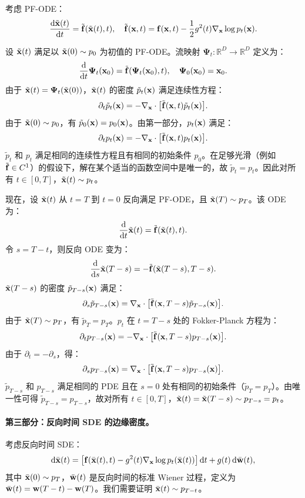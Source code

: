 考虑 PF-ODE：
\[
\frac{\mathop{}\!\mathrm{d} \tilde{{\mathbf{x}}}(t)}{\mathop{}\!\mathrm{d} t} = \tilde {{\mathbf{f}}}(\tilde{{\mathbf{x}}}(t), t), \quad \tilde {{\mathbf{f}}}({\mathbf{x}}, t) = {\mathbf{f}}({\mathbf{x}}, t) - \frac{1}{2} g^2(t) \nabla_{{\mathbf{x}}} \log p_t({\mathbf{x}}).
\]

 设 $\tilde{{\mathbf{x}}}(t)$ 满足以 $\tilde{{\mathbf{x}}}(0) \sim p_0$ 为初值的 PF-ODE。流映射 $\bm{\Psi}_t: \mathbb{R}^D \to \mathbb{R}^D$ 定义为：
\[
\frac{\mathop{}\!\mathrm{d}}{\mathop{}\!\mathrm{d} t} \bm{\Psi}_t(\mathbf{x}_0) = \tilde {{\mathbf{f}}}(\bm{\Psi}_t(\mathbf{x}_0), t), \quad \bm{\Psi}_0(\mathbf{x}_0) = \mathbf{x}_0.
\]
由于 $\tilde{{\mathbf{x}}}(t) = \bm{\Psi}_t(\tilde{{\mathbf{x}}}(0))$，$\tilde{{\mathbf{x}}}(t)$ 的密度 $\tilde p_t({\mathbf{x}})$ 满足连续性方程：
\[
\partial_t \tilde p_t({\mathbf{x}}) = -\nabla_{{\mathbf{x}}} \cdot \bigl[ \tilde {{\mathbf{f}}}({\mathbf{x}}, t) \tilde p_t({\mathbf{x}}) \bigr].
\]
由于 $\tilde{{\mathbf{x}}}(0) \sim p_0$，有 $\tilde p_0({\mathbf{x}}) = p_0({\mathbf{x}})$。由第一部分，$p_t({\mathbf{x}})$ 满足：
\[
\partial_t p_t({\mathbf{x}}) = -\nabla_{{\mathbf{x}}} \cdot \bigl[ \tilde {{\mathbf{f}}}({\mathbf{x}}, t) p_t({\mathbf{x}}) \bigr].
\]
$\tilde p_t$ 和 $p_t$ 满足相同的连续性方程且有相同的初始条件 $p_0$。在足够光滑（例如 $\tilde {{\mathbf{f}}} \in C^1$）的假设下，解在某个适当的函数空间中是唯一的，故 $\tilde p_t = p_t$。因此对所有 $t \in [0, T]$，$\tilde{{\mathbf{x}}}(t) \sim p_t$。

\vspace{0.3cm}
 现在，设 $\tilde{{\mathbf{x}}}(t)$ 从 $t = T$ 到 $t = 0$ 反向满足 PF-ODE，且 $\tilde{{\mathbf{x}}}(T) \sim p_T$。该 ODE 为：
\[
\frac{\mathop{}\!\mathrm{d}}{\mathop{}\!\mathrm{d} t} \tilde{{\mathbf{x}}}(t) = \tilde {{\mathbf{f}}}(\tilde{{\mathbf{x}}}(t), t).
\]
令 $s = T - t$，则反向 ODE 变为：
\[
\frac{\mathop{}\!\mathrm{d}}{\mathop{}\!\mathrm{d} s} \tilde{{\mathbf{x}}}(T - s) = -\tilde {{\mathbf{f}}}(\tilde{{\mathbf{x}}}(T - s), T - s).
\]
$\tilde{{\mathbf{x}}}(T - s)$ 的密度 $\tilde p_{T-s}({\mathbf{x}})$ 满足：
\[
\partial_s \tilde p_{T-s}({\mathbf{x}}) = \nabla_{{\mathbf{x}}} \cdot \bigl[ \tilde {{\mathbf{f}}}({\mathbf{x}}, T - s) \tilde p_{T-s}({\mathbf{x}}) \bigr].
\]
由于 $\tilde{{\mathbf{x}}}(T) \sim p_T$，有 $\tilde p_T = p_T$。$p_t$ 在 $t = T - s$ 处的 Fokker-Planck 方程为：
\[
\partial_t p_{T-s}({\mathbf{x}}) = -\nabla_{{\mathbf{x}}} \cdot \bigl[ \tilde {{\mathbf{f}}}({\mathbf{x}}, T - s) p_{T-s}({\mathbf{x}}) \bigr].
\]
由于 $\partial_t = -\partial_s$，得：
\[
\partial_s p_{T-s}({\mathbf{x}}) = \nabla_{{\mathbf{x}}} \cdot \bigl[ \tilde {{\mathbf{f}}}({\mathbf{x}}, T - s) p_{T-s}({\mathbf{x}}) \bigr].
\]
$\tilde p_{T-s}$ 和 $p_{T-s}$ 满足相同的 PDE 且在 $s = 0$ 处有相同的初始条件（$\tilde p_T = p_T$）。由唯一性可得 $\tilde p_{T-s} = p_{T-s}$，故对所有 $t \in [0, T]$，$\tilde{{\mathbf{x}}}(t) = \tilde{{\mathbf{x}}}(T - s) \sim p_{T-s} = p_t$。

\paragraph{第三部分：反向时间 SDE 的边缘密度。}
考虑反向时间 SDE：
\[
\mathop{}\!\mathrm{d} \bar{{\mathbf{x}}}(t) = \bigl[ {\mathbf{f}}(\bar{{\mathbf{x}}}(t), t) - g^2(t) \nabla_{{\mathbf{x}}} \log p_t(\bar{{\mathbf{x}}}(t)) \bigr] \mathop{}\!\mathrm{d} t + g(t) \mathop{}\!\mathrm{d} \bar{{\mathbf{w}}}(t),
\]
其中 $\bar{{\mathbf{x}}}(0) \sim p_T$，$\bar{{\mathbf{w}}}(t)$ 是反向时间的标准 Wiener 过程，定义为 $\bar{{\mathbf{w}}}(t) = {\mathbf{w}}(T - t) - {\mathbf{w}}(T)$。我们需要证明 $\bar{{\mathbf{x}}}(t) \sim p_{T-t}$。


